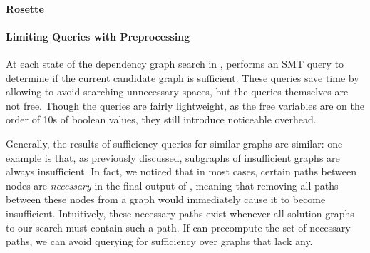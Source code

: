 
%

\paragraph{Rosette}

\paragraph{Limiting Queries with Preprocessing}

At each state of the dependency graph search in \sccsearch, \depsynth
performs an SMT query to determine if the current candidate graph
is sufficient. These queries save time by allowing \sccsearch to avoid
searching unnecessary spaces, but the queries themselves are not free.
Though the queries are fairly lightweight, as the free variables are on
the order of 10s of boolean values, they still introduce noticeable overhead.

Generally, the results of sufficiency queries for similar graphs are similar:
one example is that, as previously discussed, subgraphs of insufficient graphs
are always insufficient.
In fact, we noticed that in most cases, certain paths between nodes are
\textit{necessary} in the final output of \sccsearch, meaning that
removing all paths between these nodes from a graph would immediately
cause it to become insufficient.
Intuitively, these necessary paths exist whenever all solution graphs
to our search must contain such a path.
If \depsynth can precompute the set of necessary paths,
we can avoid querying for sufficiency over graphs that lack any.

